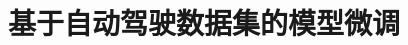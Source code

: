 \documentclass[
    linespread = 1.25
]{ctexart}
\begin{document}

\section{基于自动驾驶数据集的模型微调}





\end{document}

